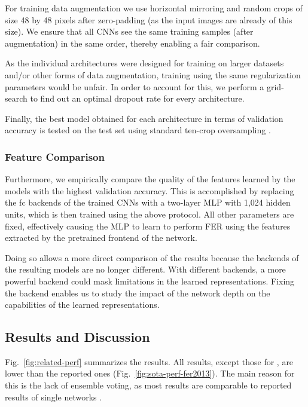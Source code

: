 \documentclass[conference,10pt,a4paper]{IEEEtran}
\begin{document}
For training data augmentation we use horizontal mirroring and random crops of size 48 by 48 pixels after zero-padding (as the input images are already of this size). We ensure that all CNNs see the same training samples (after augmentation) in the same order, thereby enabling a fair comparison.

As the individual architectures were designed for training on larger datasets and/or other forms of data augmentation, training using the same regularization parameters would be unfair. In order to account for this, we perform a grid-search to find out an optimal dropout rate for every architecture.

Finally, the best model obtained for each architecture in terms of validation accuracy is tested on the test set using standard ten-crop oversampling \cite{he15}.

\subsubsection{Feature Comparison} \label{ssub:feature_comparison}

Furthermore, we empirically compare the quality of the features learned by the models with the highest validation accuracy. This is accomplished by replacing the fc backends of the trained CNNs with a two-layer MLP with 1,024 hidden units, which is then trained using the above protocol. All other parameters are fixed, effectively causing the MLP to learn to perform FER using the features extracted by the pretrained frontend of the network.

Doing so allows a more direct comparison of the results because the backends of the resulting models are no longer different. With different backends, a more powerful backend could mask limitations in the learned representations. Fixing the backend enables us to study the impact of the network depth on the capabilities of the learned representations.

\subsection{Results and Discussion} \label{sub:results_and_discussion}

Fig.~\ref{fig:related-perf} summarizes the results. All results, except those for \cite{mollahosseini15}, are lower than the reported ones (Fig.~\ref{fig:sota-perf-fer2013}). The main reason for this is the lack of ensemble voting, as most results are comparable to reported results of single networks \cite{yu15,kim16cvpr}. 
\end{document}
